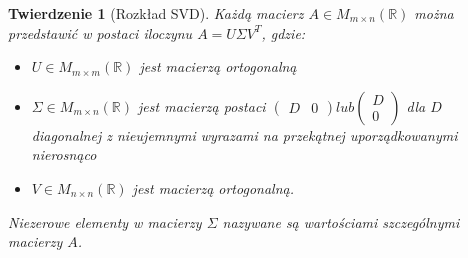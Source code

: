 \documentclass{article}
\newtheorem{theorem}{Twierdzenie}[section]
\theoremstyle{definition}
\begin{document}
\begin{theorem}[Rozkład SVD]
Każdą macierz $A \in M_{m \times n} (\mathbb{R})$ można przedstawić w postaci iloczynu $A = U \Sigma V^T$, gdzie:
\begin{itemize}
    \item $U \in M_{m \times m} (\mathbb{R})$ jest macierzą ortogonalną
    \item $\Sigma \in M_{m \times n} (\mathbb{R})$ jest macierzą postaci $\begin{pmatrix} D & 0 \end{pmatrix} lub \begin{pmatrix} D \\ 0 \end{pmatrix}$ dla $D$ diagonalnej z nieujemnymi wyrazami na przekątnej uporządkowanymi nierosnąco
    \item $V \in M_{n \times n} (\mathbb{R})$ jest macierzą ortogonalną.
\end{itemize}
Niezerowe elementy w macierzy $\Sigma$ nazywane są wartościami szczególnymi macierzy $A$.
\end{theorem}
\end{document}
